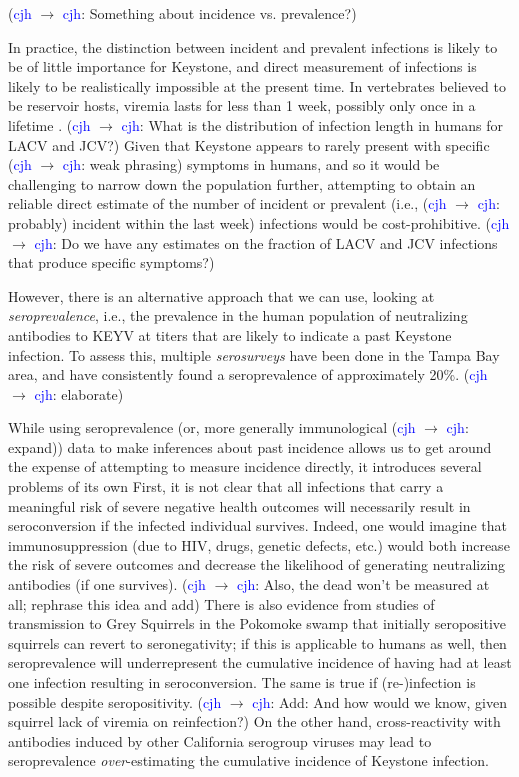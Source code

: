 \documentclass{article}
\newcommand{\cjh}{\textcolor{blue}{cjh}}
\newcommand{\msg}[3]{(#1 $\rightarrow$ #2: #3)}
\newcommand{\mcc}[1]{\msg\cjh\cjh{#1}}
\begin{document}
        \mcc{Something about incidence vs. prevalence?}

        In practice, the distinction between incident and prevalent infections is likely to be of little importance for Keystone, and direct measurement of infections is likely to be realistically impossible at the present time. In vertebrates believed to be reservoir hosts, viremia lasts for less than 1 week, possibly only once in a lifetime \cite{asdf}. \mcc{What is the distribution of infection length in humans for LACV and JCV?} Given that Keystone appears to rarely present with specific \mcc{weak phrasing} symptoms in humans, and so it would be challenging to narrow down the population further, attempting to obtain an reliable direct estimate of the number of incident or prevalent (i.e., \mcc{probably} incident within the last week) infections would be cost-prohibitive. \mcc{Do we have any estimates on the fraction of LACV and JCV infections that produce specific symptoms?}
        

        However, there is an alternative approach that we can use, looking at \textit{seroprevalence}, i.e., the prevalence in the human population of neutralizing antibodies to KEYV at titers that are likely to indicate a past Keystone infection. To assess this, multiple \textit{serosurveys} have been done in the Tampa Bay area\cite{asdf}, and have consistently found a seroprevalence of approximately 20\%\cite{asdf}. \mcc{elaborate}

        While using seroprevalence (or, more generally immunological \mcc{expand}) data to make inferences about past incidence allows us to get around the expense of attempting to measure incidence directly, it introduces several problems of its own First, it is not clear that all infections that carry a meaningful risk of severe negative health outcomes will necessarily result in seroconversion if the infected individual survives. Indeed, one would imagine that immunosuppression (due to HIV, drugs, genetic defects, etc.) would both increase the risk of severe outcomes and decrease the likelihood of generating neutralizing antibodies (if one survives). \mcc{Also, the dead won't be measured at all; rephrase this idea and add} There is also evidence from studies of transmission to Grey Squirrels in the Pokomoke swamp\cite{asdf} that initially seropositive squirrels can revert to seronegativity; if this is applicable to humans as well, then seroprevalence will underrepresent the cumulative incidence of having had at least one infection resulting in seroconversion. The same is true if (re-)infection is possible despite seropositivity. \mcc{Add: And how would we know, given squirrel lack of viremia on reinfection?} On the other hand, cross-reactivity with antibodies induced by other California serogroup viruses may lead to seroprevalence \textit{over}-estimating the cumulative incidence of Keystone infection.
\end{document}
